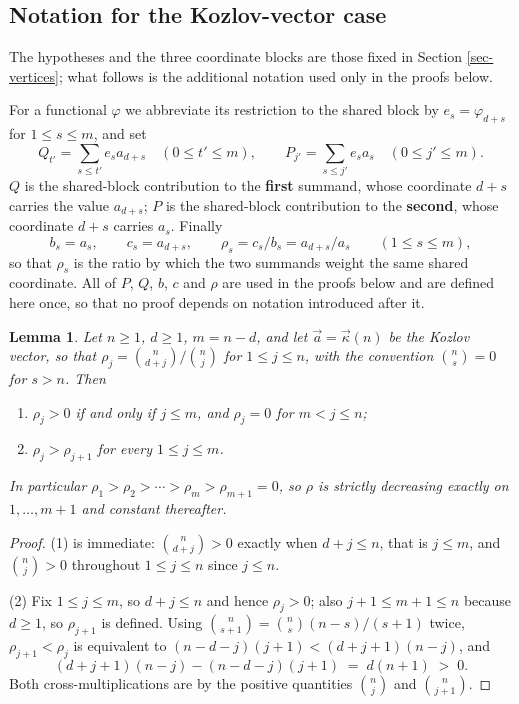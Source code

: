 \documentclass[11pt, a4paper, abstract=yes]{scrartcl}
\theoremstyle{definition}
\theoremstyle{remark}
\theoremstyle{plain}
\newtheorem{lemma}[definition]{Lemma}
\newcommand{\kozvec}{\vec\kappa}
\begin{document}
\subsection{Notation for the Kozlov-vector case}
\label{sec-app-koznot}
The hypotheses and the three coordinate blocks are those fixed in Section \ref{sec-vertices}; what
follows is the additional notation used only in the proofs below.

For a functional \(\varphi\) we abbreviate its restriction to the shared block by
\(e_s=\varphi_{d+s}\) for \(1\le s\le m\), and set
\begin{equation}\label{eq:PQ}
  Q_{t'}=\sum_{s\le t'}e_sa_{d+s}\quad(0\le t'\le m),\qquad
  P_{j'}=\sum_{s\le j'}e_sa_{s}\quad(0\le j'\le m).
\end{equation}
\(Q\) is the shared-block contribution to the \textbf{first} summand, whose coordinate \(d+s\) carries the
value \(a_{d+s}\); \(P\) is the shared-block contribution to the \textbf{second}, whose coordinate \(d+s\)
carries \(a_s\). Finally
\begin{equation}\label{eq:digraph}
  b_s=a_s,\qquad c_s=a_{d+s},\qquad \rho_s=c_s/b_s=a_{d+s}/a_s\qquad(1\le s\le m),
\end{equation}
so that \(\rho_s\) is the ratio by which the two summands weight the same shared coordinate. All of
\(P\), \(Q\), \(b\), \(c\) and \(\rho\) are used in the proofs below and are defined here once, so
that no proof depends on notation introduced after it.

\begin{lemma}
Let \(n\ge1\), \(d\ge1\), \(m=n-d\), and let \(\vec a=\kozvec(n)\) be the Kozlov vector, so that
\(\rho_j=\binom n{d+j}\big/\binom nj\) for \(1\le j\le n\), with the convention
\(\binom ns=0\) for \(s>n\). Then
\begin{enumerate}
\item \(\rho_j>0\) if and only if \(j\le m\), and \(\rho_j=0\) for \(m<j\le n\);
\item \(\rho_j>\rho_{j+1}\) for every \(1\le j\le m\).
\end{enumerate}
In particular \(\rho_1>\rho_2>\cdots>\rho_m>\rho_{m+1}=0\), so \(\rho\) is strictly decreasing
exactly on \(1,\dots,m+1\) and constant thereafter.
\label{lem:binomial-ratio}
\label{lem-binomial-ratio}
\end{lemma}

\begin{proof}
(1) is immediate: \(\binom n{d+j}>0\) exactly when \(d+j\le n\), that is \(j\le m\), and
\(\binom nj>0\) throughout \(1\le j\le n\) since \(j\le n\).

(2) Fix \(1\le j\le m\), so \(d+j\le n\) and hence \(\rho_j>0\); also \(j+1\le m+1\le n\) because
\(d\ge1\), so \(\rho_{j+1}\) is defined. Using \(\binom n{s+1}=\binom ns(n-s)/(s+1)\) twice,
\(\rho_{j+1}<\rho_j\) is equivalent to \((n-d-j)(j+1)<(d+j+1)(n-j)\), and
\begin{equation}\label{eq:binomial-ratio}
  (d+j+1)(n-j)-(n-d-j)(j+1)\;=\;d(n+1)\;>\;0 .
\end{equation}
Both cross-multiplications are by the positive quantities \(\binom nj\) and \(\binom n{j+1}\).
\end{proof}
\end{document}
